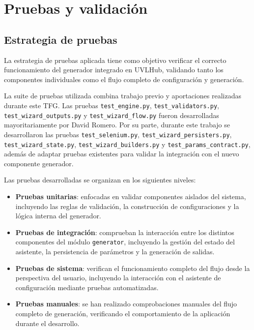 \chapter{Pruebas y validación}
\label{chap:pruebas}


\section{Estrategia de pruebas}
\label{sec:estrategia_pruebas}


La estrategia de pruebas aplicada tiene como objetivo verificar el correcto
funcionamiento del generador integrado en UVLHub, validando tanto los
componentes individuales como el flujo completo de configuración y generación.

La suite de pruebas utilizada combina trabajo previo y aportaciones realizadas
durante este TFG. Las pruebas \texttt{test\_engine.py},
\texttt{test\_validators.py}, \texttt{test\_wizard\_outputs.py} y
\texttt{test\_wizard\_flow.py} fueron desarrolladas mayoritariamente por David
Romero. Por su parte, durante este trabajo se desarrollaron las pruebas
\texttt{test\_selenium.py}, \texttt{test\_wizard\_persisters.py},
\texttt{test\_wizard\_state.py}, \texttt{test\_wizard\_builders.py} y
\texttt{test\_params\_contract.py}, además de adaptar pruebas existentes para
validar la integración con el nuevo componente generador.

Las pruebas desarrolladas se organizan en los siguientes niveles:

\begin{itemize}

    \item \textbf{Pruebas unitarias}: enfocadas en validar componentes aislados
    del sistema, incluyendo las reglas de validación, la construcción de
    configuraciones y la lógica interna del generador.

    \item \textbf{Pruebas de integración}: comprueban la interacción entre los
    distintos componentes del módulo \texttt{generator}, incluyendo la gestión
    del estado del asistente, la persistencia de parámetros y la generación de
    salidas.

    \item \textbf{Pruebas de sistema}: verifican el funcionamiento completo del
    flujo desde la perspectiva del usuario, incluyendo la interacción con el
    asistente de configuración mediante pruebas automatizadas.

    \item \textbf{Pruebas manuales}: se han realizado comprobaciones manuales del
    flujo completo de generación, verificando el comportamiento de la aplicación
    durante el desarrollo.

\end{itemize}

